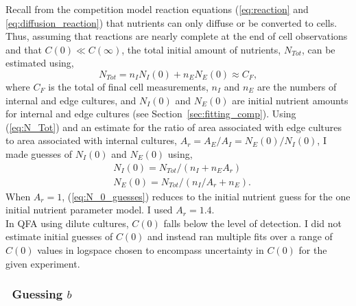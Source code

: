 Recall from the competition model reaction equations
(\ref{eq:reaction} and \ref{eq:diffusion_reaction}) that nutrients can
only diffuse or be converted to cells. Thus, assuming that reactions
are nearly complete at the end of cell observations and that
\(C(0) \ll C(\infty)\), the total initial amount of nutrients,
\(N_{Tot}\), can be estimated using,
\begin{equation}
  \label{eq:N_Tot}
  N_{Tot} = n_{I}N_{I}(0) + n_{E}N_{E}(0) \approx C_{F},
\end{equation}
where \(C_{F}\) is the total of final cell measurements, \(n_{I}\) and
\(n_{E}\) are the numbers of internal and edge cultures, and
\(N_{I}(0)\) and \(N_{E}(0)\) are initial nutrient amounts
for internal and edge cultures (see
Section~\ref{sec:fitting_comp}). Using (\ref{eq:N_Tot}) and an estimate
for the ratio of area associated with edge cultures to area associated
with internal cultures,
\(A_{r} = A_{E} / A_{I} = N_{E}(0) / N_{I}(0)\), I made
guesses of \(N_{I}(0)\) and \(N_{E}(0)\) using,
%
\begin{equation}
  \label{eq:N_0_guesses}
  \begin{aligned}
    &N_{I}(0) = N_{Tot} / (n_{I} + n_{E}A_{r})\\
    &N_{E}(0) = N_{Tot} / (n_{I}/A_{r} + n_{E}).
  \end{aligned}
\end{equation}
%
When \(A_{r} = 1\), (\ref{eq:N_0_guesses}) reduces to the initial
nutrient guess for the one initial nutrient parameter model. I used
\(A_{r} = 1.4\).
\\
In QFA using dilute cultures, \(C(0)\) falls below the level of
detection. I did not estimate initial guesses of \(C(0)\) and instead
ran multiple fits over a range of \(C(0)\) values in logspace chosen
to encompass uncertainty in \(C(0)\) for the given experiment.



\subsubsection{\boldmath \thesubsubsection~Guessing \(b\) \unboldmath}

